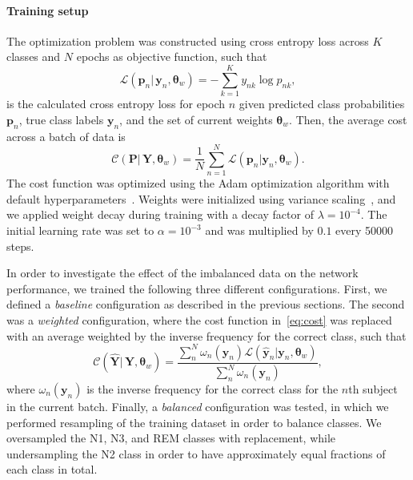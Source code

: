 \paragraph{Training setup}
The optimization problem was constructed using cross entropy loss across $K$ classes and $N$ epochs as objective function, such that
\begin{equation}
    \mathcal{L}(\mathbf{p}_{n} |\, \mathbf{y}_{n},\boldsymbol{\theta}_w) = -\sum_{k=1}^{K}{y_{nk}\log{p_{nk}}},
\end{equation}
is the calculated cross entropy loss for epoch $n$ given predicted class probabilities $\mathbf{p}_n$, true class labels $\mathbf{y}_n$, and the set of current weights $\boldsymbol{\theta}_w$.
Then, the average cost across a batch of data is
\begin{equation}
    \mathcal{C}(\mathbf{P} |\, \mathbf{Y},\boldsymbol{\theta}_w) = \frac{1}{N}\sum_{n=1}^{N}{\mathcal{L}(\mathbf{p}_{n} | \mathbf{y}_{n},\boldsymbol{\theta}_w)}\label{eq:cost}.
\end{equation}
The cost function was optimized using the Adam optimization algorithm with default hyperparameters~\cite{Kingma2015}.
Weights were initialized using variance scaling~\cite{He2015a}, and we applied weight decay during training with a decay factor of $\lambda=10^{-4}$.
The initial learning rate was set to $\alpha=10^{-3}$ and was multiplied by $0.1$ every \num{50000} steps.

In order to investigate the effect of the imbalanced data on the network performance, we trained the following three different configurations.
First, we defined a \textit{baseline} configuration as described in the previous sections.
The second was a \textit{weighted} configuration, where the cost function in~\cref{eq:cost} was replaced with an average weighted by the inverse frequency for the correct class, such that
\begin{equation}
    \mathcal{C}(\hat{\mathbf{Y}} |\, \mathbf{Y},\boldsymbol{\theta}_w) = \frac{\sum_{n}^{N} \omega_{n}(\mathbf{y}_{n}) \mathcal{L}(\hat{\mathbf{y}}_{n} | \mathbf{y}_{n},\boldsymbol{\theta}_w)}{\sum_{n}^{N} \omega_{n}(\mathbf{y}_{n})},
\end{equation}
where $\omega_{n}(\mathbf{y}_{n})$ is the inverse frequency for the correct class for the $n$th subject in the current batch.
Finally, a \textit{balanced} configuration was tested, in which we performed resampling of the training dataset in order to balance classes.
We oversampled the \ac{N1}, \ac{N3}, and \ac{REM} classes with replacement, while undersampling the \ac{N2} class in order to have approximately equal fractions of each class in total.

